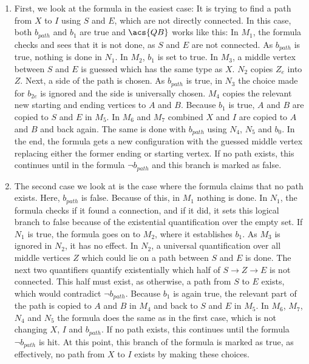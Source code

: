 \begin{enumerate}
    \item First, we look at the formula in the easiest case: It is trying to find a path from $X$ to $I$ using $S$ and $E$, which are not directly connected.
    In this case, both $b_{path}$ and $b_1$ are true and $\acs{QB}$ works like this:
    In $M_1$, the formula checks and sees that it is not done, as $S$ and $E$ are not connected.
    As $b_{path}$ is true, nothing is done in $N_1$.
    In $M_2$, $b_1$ is set to true.
    In $M_3$, a middle vertex between $S$ and $E$ is guessed which has the same type as $X$.
    $N_2$ copies $Z_e$ into $Z$.
    Next, a side of the path is chosen.
    As $b_{path}$ is true, in $N_3$ the choice made for $b_{2e}$ is ignored and the side is universally chosen.
    $M_4$ copies the relevant new starting and ending vertices to $A$ and $B$.
    Because $b_1$ is true, $A$ and $B$ are copied to $S$ and $E$ in $M_5$.
    In $M_6$ and $M_7$ combined  $X$ and $I$ are copied to $A$ and $B$ and back again.
    The same is done with $b_{path}$ using $N_4$, $N_5$ and $b_0$.
    In the end, the formula gets a new configuration with the guessed middle vertex replacing either the former ending or starting vertex.
    If no path exists, this continues until in the formula $\neg b_{path}$ and this branch is marked as false.

    \item The second case we look at is the case where the formula claims that no path exists.
    Here, $b_{path}$ is false.
    Because of this, in $M_1$ nothing is done.
    In $N_1$, the formula checks if it found a connection, and if it did, it sets this logical branch to false because of the existential quantification over the empty set.
    If $N_1$ is true, the formula goes on to $M_2$, where it establishes $b_1$.
    As $M_3$ is ignored in $N_2$, it has no effect.
    In $N_2$, a universal quantification over all middle vertices $Z$ which could lie on a path between $S$ and $E$ is done.
    The next two quantifiers quantify existentially which half of $S \to Z \to E$ is not connected.
    This half must exist, as otherwise, a path from $S$ to $E$ exists, which would contradict $\neg b_{path}$.
    Because $b_1$ is again true, the relevant part of the path is copied to $A$ and $B$ in $M_4$ and back to $S$ and $E$ in $M_5$.
    In $M_6$, $M_7$, $N_4$ and $N_5$ the formula does the same as in the first case, which is not changing $X$, $I$ and $b_{path}$.
    If no path exists, this continues until the formula $\neg b_{path}$ is hit.
    At this point, this branch of the formula is marked as true, as effectively, no path from $X$ to $I$ exists by making these choices.


\end{enumerate}
